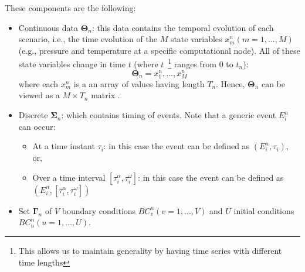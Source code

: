 These components are the following:
\begin{itemize}
  \item Continuous data $\bm{\Theta}_n$: this data contains the temporal evolution of each scenario, i.e., 
        the time evolution
        of the $M$ state variables $x_m^n (m=1,\ldots,M)$ (e.g., pressure and temperature at a specific 
        computational node). 
        All of these state variables change in time $t$ (where $t$~\footnote{This allows us to 
        maintain generality by having time series with different time lengths} ranges from 0 to $t_n$): 
        \begin{equation}
          \bm{\Theta}_n = {x_1^n,\ldots,x_M^n}  
          \label{eq:bigTheta}
        \end{equation}  
        where each $x_m^n$ is a an array of values having length $T_n$. Hence, $\bm{\Theta}_n$ can be viewed 
        as a $M \times T_n$ matrix .
  \item Discrete $\bm{\Sigma}_n$: which contains timing of events. Note that a generic event $E_i^n$ can occur:
        \begin{itemize}
          \item At a time instant $\tau_i$: in this case the event can be defined as $(E_i^n,\tau_i)$, or,
          \item Over a time interval $[\tau_i^\alpha,\tau_i^\omega]$: in this case the event can be defined 
                as $(E_i^n,[\tau_i^\alpha,\tau_i^\omega])$
        \end{itemize} 
  \item Set $\bm{\Gamma}_n$ of $V$ boundary conditions $BC_v^n (v=1,\ldots,V)$ and $U$ initial 
        conditions $BC_u^n (u=1,\ldots,U)$.
\end{itemize}


